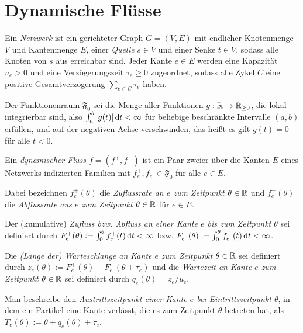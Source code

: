\section{Dynamische Flüsse}

\begin{definition}[Netzwerk]
	Ein \emph{Netzwerk} ist ein gerichteter Graph $G=(V,E)$ mit endlicher Knotenmenge $V$ und Kantenmenge $E$, einer \emph{Quelle} $s\in V$ und einer Senke $t\in V$, sodass alle Knoten von $s$ aus erreichbar sind.
	Jeder Kante $e\in E$ werden eine Kapazität $u_e > 0$ und eine Verzögerungszeit $\tau_e\geq 0$ zugeordnet, sodass alle Zykel $C$ eine positive Gesamtverzögerung $\sum_{e\in C}\tau_e$ haben.
\end{definition}

\begin{definition}
	Der Funktionenraum $\mathfrak{F}_0$ sei die Menge aller Funktionen $g: \mathbb{R} \to \mathbb{R}_{\geq 0}$, die lokal integrierbar sind, also $\int_a^b |g(t)| \mathop{}\!\mathrm{d} t< \infty$ für beliebige beschränkte Intervalle $(a,b)$ erfüllen, und auf der negativen Achse verschwinden, das heißt es gilt $g(t)=0$ für alle $t<0$.
\end{definition}

\begin{definition}
	Ein \emph{dynamischer Fluss $f=(f^+, f^-)$} ist ein Paar zweier über die Kanten $E$ eines Netzwerks indizierten Familien mit $f^+_e,f^-_e\in\mathfrak F_0$ für alle $e\in E$.
	
	Dabei bezeichnen $f_e^+(\theta)$ die \emph{Zuflussrate an $e$ zum Zeitpunkt $\theta\in\mathbb{R}$} und $f_e^-(\theta)$ die \emph{Abflussrate aus $e$ zum Zeitpunkt $\theta\in\mathbb{R}$} für $e\in E$.
	
	Der (kumulative) \emph{Zufluss bzw. Abfluss an einer Kante $e$ bis zum Zeitpunkt $\theta$} sei definiert durch $F^+_e(\theta):=\int_0^\theta f^+_e(t) \mathop{}\!\mathrm{d} t<\infty$ bzw. $F^-_e(\theta):=\int_0^\theta f^-_e(t) \mathop{}\!\mathrm{d} t<\infty$.
	
	Die \emph{(Länge der) Warteschlange an Kante $e$ zum Zeitpunkt $\theta\in\mathbb{R}$} sei definiert durch $z_e(\theta):= F_e^+(\theta) - F_e^-(\theta + \tau_e)$ und die \emph{Wartezeit an Kante $e$ zum Zeitpunkt $\theta\in\mathbb{R}$} sei definiert durch $q_e(\theta) = z_e / u_e$.
	
	Man beschreibe den \emph{Austrittszeitpunkt einer Kante $e$ bei Eintrittszeitpunkt $\theta$}, in dem ein Partikel eine Kante verlässt, die es zum Zeitpunkt $\theta$ betreten hat, als $T_e(\theta):=\theta + q_e(\theta) + \tau_e$.
\end{definition}


